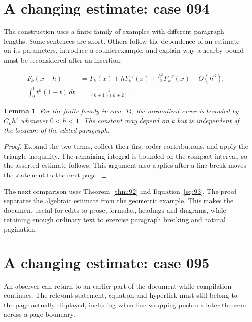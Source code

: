 \documentclass[a4paper,10pt]{article}
\newtheorem{lemma}[theorem]{Lemma}
\begin{document}
\lipsum[13]

\section{A changing estimate: case 094}\label{unit:93}
The construction uses a finite family of examples with different paragraph lengths. Some sentences are short. Others follow the dependence of an estimate on its parameters, introduce a counterexample, and explain why a nearby bound must be reconsidered after an insertion.

\lipsum[10-11]
\begin{align}\label{eq:93}
 F_k(x+h)&=F_k(x)+hF_k'(x)+\frac{h^2}{2}F_k''(x)+O(h^3),\\
 \int_0^1 t^k(1-t)\,dt&=\frac{1}{(k+1)(k+2)}.
\end{align}
\begin{lemma}\label{thm:93}
For the finite family in case 94, the normalized error is bounded by $C_k h^2$ whenever $0<h<1$. The constant may depend on $k$ but is independent of the location of the edited paragraph.
\end{lemma}
\begin{proof}
Expand the two terms, collect their first-order contributions, and apply the
triangle inequality. The remaining integral is bounded on the compact interval,
so the asserted estimate follows. This argument also applies after a line break
moves the statement to the next page.
\end{proof}
\begin{center}
\end{center}
The next comparison uses Theorem~\ref{thm:92} and Equation~\ref{eq:93}. The proof separates the algebraic estimate from the geometric example. This makes the document useful for edits to prose, formulas, headings and diagrams, while retaining enough ordinary text to exercise paragraph breaking and natural pagination.

\lipsum[18]

\section{A changing estimate: case 095}\label{unit:94}
An observer can return to an earlier part of the document while compilation continues. The relevant statement, equation and hyperlink must still belong to the page actually displayed, including when line wrapping pushes a later theorem across a page boundary.
\end{document}
